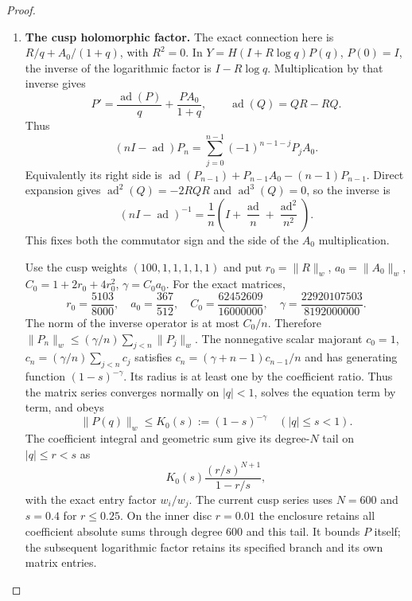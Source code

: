 \begin{proof}
\begin{enumerate}[label={$\langle1\rangle$\arabic*.}]
\begin{enumerate}[label={$\langle2\rangle$\arabic*.},leftmargin=*]
\item \textbf{The cusp holomorphic factor.}
The exact connection here is
$R/q+A_0/(1+q)$, with $R^2=0$. In
$Y=H(I+R\log q)P(q)$, $P(0)=I$, the inverse of the logarithmic
factor is $I-R\log q$. Multiplication by that inverse gives
\[
 P'=\frac{\operatorname{ad}(P)}q+\frac{PA_0}{1+q},
 \qquad\operatorname{ad}(Q)=QR-RQ.
\]
Thus
\[
 (nI-\operatorname{ad})P_n
  =\sum_{j=0}^{n-1}(-1)^{n-1-j}P_jA_0.
\]
Equivalently its right side is
$\operatorname{ad}(P_{n-1})+P_{n-1}A_0-(n-1)P_{n-1}$.
Direct expansion gives
$\operatorname{ad}^2(Q)=-2RQR$ and
$\operatorname{ad}^3(Q)=0$, so the inverse is
\[
 (nI-\operatorname{ad})^{-1}
  =\frac1n\left(I+\frac{\operatorname{ad}}n
                   +\frac{\operatorname{ad}^2}{n^2}\right).
\]
This fixes both the commutator sign and the side of the $A_0$
multiplication.

Use the cusp weights $(100,1,1,1,1,1)$ and put
$r_0=\|R\|_w$, $a_0=\|A_0\|_w$,
$C_0=1+2r_0+4r_0^2$, $\gamma=C_0a_0$. For the exact
matrices,
\[
 r_0=\frac{5103}{8000},\quad a_0=\frac{367}{512},\quad
 C_0=\frac{62452609}{16000000},\quad
 \gamma=\frac{22920107503}{8192000000}.
\]
The norm of the inverse operator is at most $C_0/n$. Therefore
$\|P_n\|_w\le(\gamma/n)\sum_{j<n}\|P_j\|_w$.
The nonnegative scalar majorant $c_0=1$,
$c_n=(\gamma/n)\sum_{j<n}c_j$ satisfies
$c_n=(\gamma+n-1)c_{n-1}/n$ and has generating function
$(1-s)^{-\gamma}$. Its radius is at least one by the coefficient
ratio. Thus the matrix series converges normally on
$|q|<1$, solves the equation term by term, and obeys
\[
 \|P(q)\|_w\le K_0(s):=(1-s)^{-\gamma}\quad(|q|\le s<1).
\]
The coefficient integral and geometric sum give its degree-$N$
tail on $|q|\le r<s$ as
\[
 K_0(s)\frac{(r/s)^{N+1}}{1-r/s},
\]
with the exact entry factor $w_i/w_j$. The current cusp series
uses $N=600$ and $s=0.4$ for $r\le0.25$. On the inner disc
$r=0.01$ the enclosure retains all coefficient absolute
sums through degree 600 and this tail. It bounds $P$ itself;
the subsequent logarithmic factor retains its specified branch
and its own matrix entries.


\end{enumerate}
\end{enumerate}
\end{proof}
